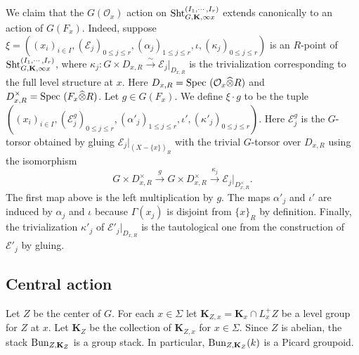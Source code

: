 \documentclass[11pt]{amsart}
\numberwithin{equation}{section}
\theoremstyle{plain}
\theoremstyle{definition}
\newcommand\cE{\mathcal{E}}
\newcommand\cO{\mathcal{O}}
\def\bK{\mathbf{K}}
\newcommand{\Bun}{\textup{Bun}}
\newcommand\Sht{\textup{Sht}}
\newcommand\Spec{\textup{Spec}\ }
\newcommand{\isom}{\stackrel{\sim}{\to}}
\newcommand{\wh}[1]{\widehat{#1}}
\newcommand\xr{\xrightarrow}
\newcommand\ot{\otimes}
\renewcommand\a\alpha
\newcommand\G\Gamma
\newcommand{\io}{\iota}
\newcommand{\ka}{\kappa}
\newcommand{\Sig}{\Sigma}
\begin{document}
We claim that the $G(\cO_{x})$ action on $\Sht^{(I_{1},\cdots, I_{r})}_{G, \bK,\infty x}$ extends canonically to an action of $G(F_{x})$. Indeed, suppose $\xi=((x_{i})_{i\in I}, (\cE_{j})_{0\le j\le r}, (\a_{j})_{1\le j\le r}, \io, (\ka_{j})_{0\le j\le r})$ is an $R$-point of $\Sht^{(I_{1},\cdots, I_{r})}_{G,\bK,\infty x}$, where $\ka_{j}: G\times D_{x, R}\isom \cE_{j}|_{D_{x,R}}$ is the trivialization corresponding to the full level structure at $x$. Here $D_{x,R}=\Spec(\cO_{x}\wh\ot R)$ and $D_{x,R}^{\times}=\Spec(F_{x}\wh\ot R)$. Let $g\in G(F_{x})$. We define $\xi\cdot g$ to be the tuple $((x_{i})_{i\in I}, (\cE^{g}_{j})_{0\le j\le r}, (\a'_{j})_{1\le j\le r}, \io', (\ka'_{j})_{0\le j\le r})$. Here $\cE^{g}_{j}$ is the $G$-torsor obtained by gluing $\cE_{j}|_{(X-\{x\})_{R}}$ with the trivial $G$-torsor over $D_{x,R}$ using the isomorphism
\begin{equation*}
G\times D^{\times}_{x, R}\xr{g} G\times D^{\times}_{x, R} \xr{\ka_{j}} \cE_{j}|_{D^{\times}_{x,R}}.
\end{equation*}
The first map above is the left multiplication by $g$. The maps $\a'_{j}$ and $\io'$ are induced by $\a_{j}$ and $\io$ because $\G(x_{j})$ is disjoint from $\{x\}_{R}$ by definition. Finally, the trivialization $\ka'_{j}$ of $\cE'_{j}|_{D_{x,R}}$ is the tautological one from the construction of $\cE'_{j}$ by gluing. 





\subsection{Central action}\label{sss:central action}

Let $Z$ be the center of $G$. For each $x\in \Sig$ let $\bK_{Z,x}=\bK_{x}\cap L^{+}_{x}Z$ be a level group for $Z$ at $x$. Let $\bK_{Z}$ be the collection of $\bK_{Z,x}$ for $x\in \Sig$. Since $Z$ is abelian, the stack $\Bun_{Z,\bK_{Z}}$ is a group stack. In particular, $\Bun_{Z,\bK_{Z}}(k)$ is a Picard groupoid. 
\end{document}
